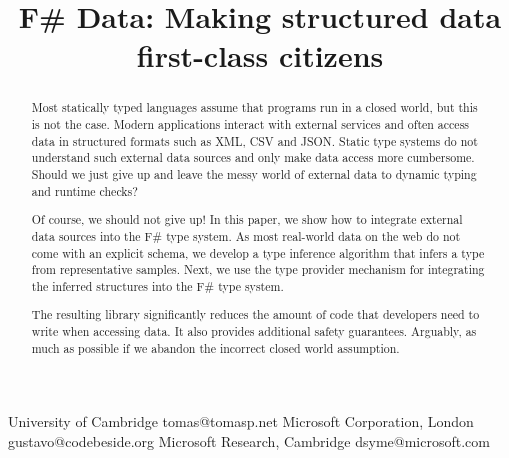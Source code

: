 \documentclass[preprint]{sigplanconf}
\begin{document}
\setlength{\pdfpageheight}{\paperheight}
\setlength{\pdfpagewidth}{\paperwidth}


\title{F\# Data: \textnormal{Making structured data first-class citizens}}

           {University of Cambridge}
           {tomas@tomasp.net}
           {Microsoft Corporation, London}
           {gustavo@codebeside.org}
           {Microsoft Research, Cambridge}
           {dsyme@microsoft.com}
\maketitle


\begin{abstract}
Most statically typed languages assume that programs run in a closed world, but this is not the 
case. Modern applications interact with external services and often access data in structured 
formats such as XML, CSV and JSON. Static type systems do not understand such external data sources
and only make data access more cumbersome. Should we just give up and leave the messy world of 
external data to dynamic typing and runtime checks?

Of course, we should not give up! In this paper, we show how to integrate external data sources 
into the F\# type system. As most real-world data on the web do not come with an explicit schema, 
we develop a type inference algorithm that infers a type from representative samples. Next, we use 
the type provider mechanism for integrating the inferred structures into the F\# type
system. 

The resulting library significantly reduces the amount of code that developers need to write when 
accessing data. It also provides additional safety guarantees. Arguably, as much as possible 
if we abandon the incorrect closed world assumption.
\end{abstract}
\end{document}
